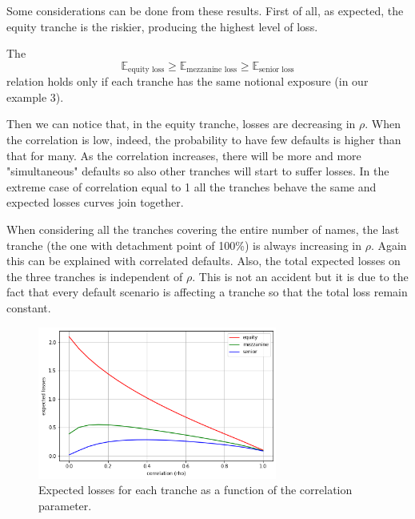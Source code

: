 Some considerations can be done from these results. First of all, as expected, the equity tranche is the riskier, producing the highest level of loss. 

The 
\begin{equation}
\mathbb{E}_{\textrm{equity loss}} \ge \mathbb{E}_{\textrm{mezzanine loss}} \ge \mathbb{E}_{\textrm{senior loss}}
\end{equation}
relation holds only if each tranche has the same notional exposure (in our example 3).

Then we can notice that, in the equity tranche, losses are decreasing in $\rho$. When the correlation is low, indeed, the probability to have few defaults is higher than that for many. As the correlation increases, there will be more and more "simultaneous" defaults so also other tranches will start to suffer losses. In the extreme case of correlation equal to 1 all the tranches behave the same and expected losses curves join together. 

When considering all the tranches covering the entire number of names, the last tranche (the one with detachment point of 100\%) is always increasing in $\rho$. Again this can be explained with correlated defaults. 
Also, the total expected losses on the three tranches is independent of $\rho$. This is not an accident but it is due to the fact that every default scenario is affecting a tranche so that the total loss remain constant.

\begin{figure}[htb]
	\centering
	\includegraphics[width=0.7\textwidth]{figures/losses_vs_rho}
	\caption{Expected losses for each tranche as a function of the correlation parameter.}
	\label{fig:losses_rho}
\end{figure}

